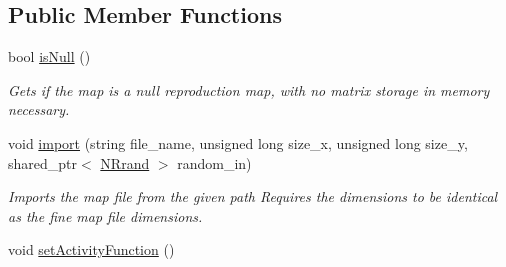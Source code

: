 \subsection*{Public Member Functions}
\begin{DoxyCompactItemize}
\item 
bool \hyperlink{class_activity_map_ad77d0052639050280df746d7b21e68a8}{is\+Null} ()
\begin{DoxyCompactList}\small\item\em Gets if the map is a null reproduction map, with no matrix storage in memory necessary. \end{DoxyCompactList}\item 
void \hyperlink{class_activity_map_a13d7fbbe6c79ca0af1d60314a2fe6187}{import} (string file\+\_\+name, unsigned long size\+\_\+x, unsigned long size\+\_\+y, shared\+\_\+ptr$<$ \hyperlink{class_n_rrand}{N\+Rrand} $>$ random\+\_\+in)
\begin{DoxyCompactList}\small\item\em Imports the map file from the given path Requires the dimensions to be identical as the fine map file dimensions. \end{DoxyCompactList}\item 
void \hyperlink{class_activity_map_a5ae1efb4f4745e379a2ebfa59511404b}{set\+Activity\+Function} ()\hypertarget{class_activity_map_a5ae1efb4f4745e379a2ebfa59511404b}{}\label{class_activity_map_a5ae1efb4f4745e379a2ebfa59511404b}


\end{DoxyCompactItemize}
